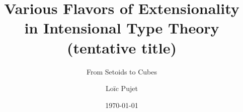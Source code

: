 \documentclass[
	a4paper, %
	fontsize=10pt, %
	twoside=false, %
	numbers=noenddot, %
]{kaobook}
\begin{document}


\titlehead{Various Flavors of Extensionality in Intensional Type Theory (tentative title)}
\subject{Thèse de Doctorat}

\title[Various Flavors of Extensionality in Intensional Type Theory]{Various Flavors of Extensionality in Intensional Type Theory (tentative title)}
\subtitle{From Setoids to Cubes}

\author[Loïc Pujet]{Loïc Pujet}

\date{\today}

\publishers{École Doctorale MathSTIC}


\frontmatter %





\end{document}
